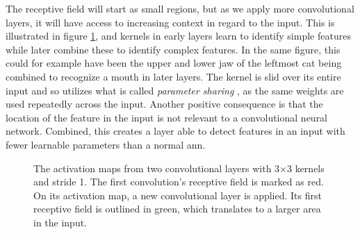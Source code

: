    The receptive field will start as small regions, but as we apply more convolutional layers, it will have access to increasing context in regard to the input\cite{o2015introduction_convolutions}. This is illustrated in figure \ref{receptive_field_fig}, and kernels in early layers learn to identify simple features while later combine these to identify complex features. In the same figure, this could for example have been the upper and lower jaw of the leftmost cat being combined to recognize a mouth in later layers. The kernel is slid over its entire input and so utilizes what is called \textit{parameter sharing }, as the same weights are used repeatedly across the input. Another positive consequence is that the location of the feature in the input is not relevant to a convolutional neural network. Combined, this creates a layer able to detect features in an input with fewer learnable parameters than a normal \gls{ann}. 
    
    \begin{figure}[H]
        \centering
        
        
        \caption[Receptive field]{The activation maps from two convolutional layers with 3×3 kernels and stride 1. The first convolution's receptive field is marked as red. On its activation map, a new convolutional layer is applied. Its first receptive field is outlined in green, which translates to a larger area in the input.}
      	\medskip 
        \label{receptive_field_fig}
    \end{figure}

    

